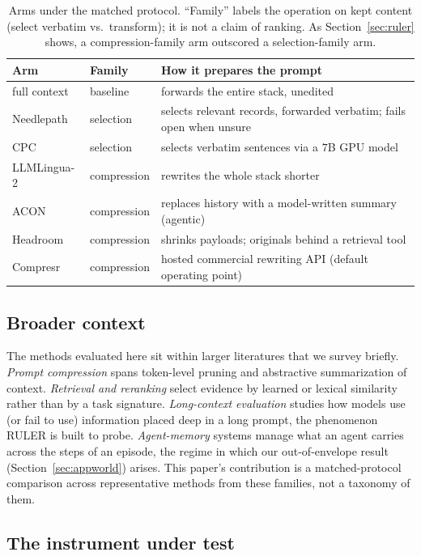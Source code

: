 \documentclass[11pt]{article}
\newcommand{\NP}{Needlepath}
\begin{document}
\begin{table}[t]
\centering
\small
\begin{tabular}{@{}lll@{}}
\toprule
Arm & Family & How it prepares the prompt \\
\midrule
full context   & baseline    & forwards the entire stack, unedited \\
\NP{}          & selection   & selects relevant records, forwarded verbatim; fails open when unsure \\
CPC            & selection   & selects verbatim sentences via a $7$B GPU model \\
LLMLingua-2    & compression & rewrites the whole stack shorter \\
ACON           & compression & replaces history with a model-written summary (agentic) \\
Headroom       & compression & shrinks payloads; originals behind a retrieval tool \\
Compresr       & compression & hosted commercial rewriting API (default operating point) \\
\bottomrule
\end{tabular}
\caption{Arms under the matched protocol. ``Family'' labels the operation on kept content
(select verbatim vs.\ transform); it is not a claim of ranking. As Section~\ref{sec:ruler}
shows, a compression-family arm outscored a selection-family arm.}
\label{tab:arms}
\end{table}

\subsection{Broader context}

The methods evaluated here sit within larger literatures that we survey briefly. \emph{Prompt
compression} spans token-level pruning and abstractive summarization of context. \emph{Retrieval and
reranking} select evidence by learned or lexical similarity rather than by a task signature.
\emph{Long-context evaluation} studies how models use (or fail to use) information placed deep
in a long prompt, the phenomenon RULER is built to probe. \emph{Agent-memory} systems manage what an
agent carries across the steps of an episode, the regime in which our out-of-envelope result
(Section~\ref{sec:appworld}) arises. This paper's contribution is a matched-protocol comparison
across representative methods from these families, not a taxonomy of them.

\subsection{The instrument under test}
\label{sec:np}
\end{document}
